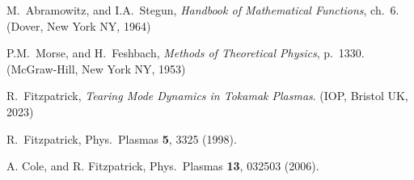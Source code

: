 \documentclass[12pt,prb,aps]{revtex4-1}
\begin{document}
\begin{thebibliography}{99}
 M.~Abramowitz, and I.A.~Stegun, {\em Handbook of Mathematical Functions}, ch.~6. (Dover, New York NY, 1964)

 P.M.~Morse, and H.~Feshbach, {\em Methods of Theoretical Physics}, p.~1330. (McGraw-Hill, New York NY, 1953)

 R.~Fitzpatrick, {\em Tearing Mode Dynamics in Tokamak Plasmas}. (IOP, Bristol UK,  2023)

 R.~Fitzpatrick, Phys.\ Plasmas {\bf 5}, 3325 (1998).

 A. Cole, and R. Fitzpatrick, Phys.\ Plasmas {\bf 13}, 032503 (2006).

\end{thebibliography}
\end{document}
